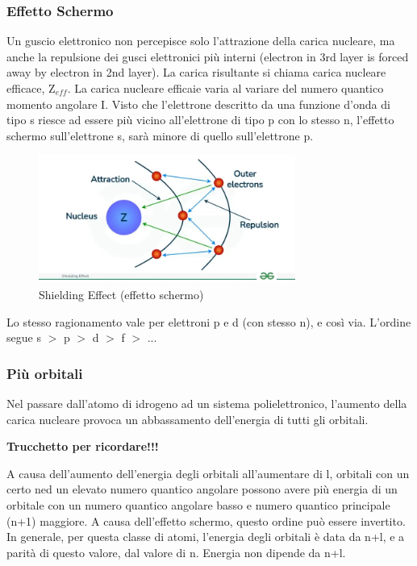 \documentclass[a4paper]{article}
\begin{document}
\subsubsection{Effetto Schermo}
Un guscio elettronico non percepisce solo l'attrazione della carica nucleare, ma anche la repulsione dei gusci elettronici più interni (electron in 3rd layer is forced away by electron in 2nd layer). La carica risultante si chiama carica nucleare efficace, Z$_{eff}$. La carica nucleare efficaie varia al variare del numero quantico momento angolare I. Visto che l'elettrone descritto da una funzione d'onda di tipo s riesce ad essere più vicino all'elettrone di tipo p con lo stesso n, l'effetto schermo sull'elettrone s, sarà minore di quello sull'elettrone p. 
\begin{figure}[!h]
    \centering
    \includegraphics[width=0.75\textwidth]{Shielding-Effect.jpg}
    \caption{Shielding Effect (effetto schermo)}
\end{figure}
\FloatBarrier
Lo stesso ragionamento vale per elettroni p e d (con stesso n), e così via. L'ordine segue s $>$ p $>$ d $>$ f $>$ ...  

\subsubsection{Più orbitali}
Nel passare dall'atomo di idrogeno ad un sistema polielettronico, l'aumento della carica nucleare provoca un abbassamento dell'energia di tutti gli orbitali. \\
\begin{center}
    \textbf{\Large{Trucchetto per ricordare!!!}}
\end{center}
A causa dell'aumento dell'energia degli orbitali all'aumentare di l, orbitali con un certo ned un elevato numero quantico angolare possono avere più energia di un orbitale con un numero quantico angolare basso e numero quantico principale (n+1) maggiore. A causa dell'effetto schermo, questo ordine può essere invertito. In generale, per questa classe di atomi, l'energia degli orbitali è data da n+l, e a parità di questo valore, dal valore di n. Energia non dipende da n+l. 
\end{document}
